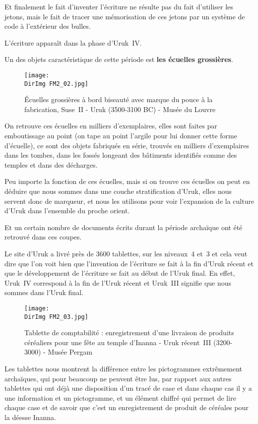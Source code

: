 \documentclass[a4paper,10pt]{article}
\newcommand{\DirImg}{../img/FaivreMartin/}
\begin{document}
Et finalement le fait d'inventer l'écriture ne résulte pas du fait 
d'utiliser les jetons, mais le fait de tracer une mémorisation de ces 
jetons par un système de code à l'extérieur des bulles.

L'écriture apparaît dans la phase d'Uruk~IV.

Un des objets caractéristique de cette période est \textbf{les 
écuelles grossières}.

\begin{figure}
  \centering
  \texttt{[image: \\DirImg FM2\_02.jpg]}
  \caption{\'Ecuelles grossières à bord biseauté avec marque du pouce 
           à la fabrication, Suse~II - Uruk (3500-3100 BC) - Musée du 
           Louvre}
  \label{}
\end{figure}

On retrouve ces écuelles en milliers d'exemplaires, elles sont faites 
par emboutissage au point (on tape au point l'argile pour lui donner 
cette forme d'écuelle), ce sont des objets fabriqués en série, trouvés 
en milliers d'exemplaires dans les tombes, dans les fossés longeant des 
bâtiments identifiés comme des temples et dans des décharges.

Peu importe la fonction de ces écuelles, mais si on trouve ces écuelles 
on peut en déduire que nous sommes dans une couche stratification d'Uruk, 
elles nous servent donc de marqueur, et nous les utilisons pour voir 
l'expansion de la culture d'Uruk dans l'ensemble du proche orient.

Et un certain nombre de documents écrits durant la période archaïque ont 
été retrouvé dans ces coupes.

Le site d'Uruk a livré près de \si{3600} tablettes, sur les niveaux~4 et~3 
et cela veut dire que l'on voit bien que l'invention de l'écriture se fait 
à la fin d'Uruk récent et que le développement de l'écriture se fait au 
début de l'Uruk final. En effet, Uruk~IV correspond à la fin de l'Uruk 
récent et Uruk~III signifie que nous sommes dans l'Uruk final.

\begin{figure}
  \centering
  \texttt{[image: \\DirImg FM2\_03.jpg]}
  \caption{Tablette de comptabilité : enregistrement d'une livraison de 
           produits céréaliers pour une fête au temple d'Inanna - Uruk 
           récent~III (3200-3000) - Musée Pergam}
  \label{}
\end{figure}

Les tablettes nous montrent la différence entre les pictogrammes extrêmement 
archaïques, qui pour beaucoup ne peuvent être lus, par rapport aux autres 
tablettes qui ont déjà une disposition d'un tracé de case et dans chaque cas 
il y a une information et un pictogramme, et un élément chiffré qui permet 
de lire chaque case et de savoir que c'est un enregistrement de produit de 
céréales pour la déesse Inanna.
\end{document}
